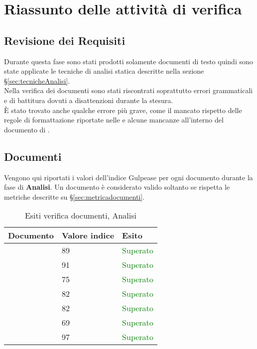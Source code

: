 \section{Riassunto delle attività di verifica}{
\subsection{Revisione dei Requisiti}{

Durante questa fase sono stati prodotti solamente documenti di testo quindi sono state applicate le tecniche di analisi statica descritte nella sezione \S\ref{sec:tecnicheAnalisi}.\\
Nella verifica dei documenti sono stati riscontrati soprattutto errori grammaticali e di battitura dovuti a disattenzioni durante la stesura.\\
È stato trovato anche qualche errore più grave, come il mancato rispetto delle regole di formattazione riportate nelle \NormeDiProgetto e alcune mancanze all'interno del documento di \AnalisiDeiRequisiti.\\
}
\subsection{Documenti}{
Vengono qui riportati i valori dell’indice Gulpease per ogni documento durante la fase di \textbf{Analisi}. Un documento è considerato valido soltanto se rispetta le metriche descritte su \S\ref{sec:metricadocumenti}.

\begin{table}[H]
	\centering
	\begin{tabular}{p{}p{}
			p{}}
		\toprule Documento & Valore indice & Esito \\
		\midrule
		\PianoDiProgetto & 89 & \textcolor{green}{Superato} \\
		\AnalisiDeiRequisiti & 91 & \textcolor{green}{Superato} \\
		\NormeDiProgetto & 75 & \textcolor{green}{Superato} \\
		\PianoDiQualifica & 82 & \textcolor{green}{Superato} \\
		\StudioDiFattibilita & 82 & \textcolor{green}{Superato} \\
		\SpecificaTecnica & 69 & \textcolor{green}{Superato}\\
		\Glossario & 97 & \textcolor{green}{Superato} \\
		\bottomrule
	\end{tabular}
	\label{tab:costorequisiti}
	\caption{Esiti verifica documenti, Analisi}
\end{table}

}}
